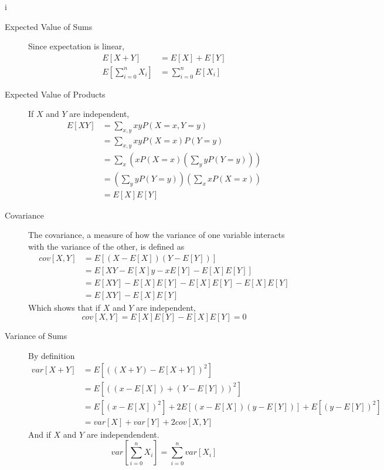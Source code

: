i\documentclass[10pt]{article}
\begin{document}
\begin{description}
    \item[Expected Value of Sums]
        Since expectation is linear, 
        \begin{align*}
            E[X + Y] &= E[X] + E[Y] \\
            E\left[\sum_{i=0}^n X_i\right] &= \sum_{i=0}^n E[X_i]
        \end{align*}
    \item[Expected Value of Products]
        If $X$ and $Y$ are independent,
        \begin{align*}
            E[XY] &= \sum_{x,y} xyP(X = x, Y = y)  \\
                  &= \sum_{x,y} xyP(X = x)P(Y = y) \\
                  &= \sum_{x} \left(xP(X = x) \left( \sum_{y} yP(Y = y)\right) \right)  \\
                  &= \left(\sum_{y} yP(Y = y) \right) \left( \sum_{x} xP(X = x) \right) \\
                  &= E[X]E[Y]
        \end{align*}
    \item[Covariance]
        The covariance, a measure of how the variance of one variable interacts with the variance of the 
        other, is defined as
        \begin{align*}
            cov[X,Y] &= E[(X - E[X])(Y - E[Y])] \\
                     &= E[XY - E[X]y - xE[Y] - E[X]E[Y]] \\
                     &= E[XY] - E[X]E[Y] - E[X]E[Y] - E[X]E[Y] \\
                     &= E[XY] - E[X]E[Y]
        \end{align*}
        Which shows that if $X$ and $Y$ are independent,
        \[ cov[X,Y] = E[X]E[Y] - E[X]E[Y] = 0 \]
    \item[Variance of Sums]
        By definition
        \begin{align*}
            var[X+Y] &= E[((X+Y) - E[X+Y])^2] \\
                     &= E[((x - E[X]) + (Y - E[Y]))^2] \\
                     &= E[(x - E[X])^2] + 2E[(x - E[X])(y - E[Y])] + E[(y - E[Y])^2] \\
                     &= var[X] + var[Y] + 2cov[X,Y]
        \end{align*}
        And if $X$ and $Y$ are independendent.
        \[ var\left[ \sum_{i=0}^n X_i \right] = \sum_{i=0}^n var[X_i] \]
\end{description}
\end{document}
